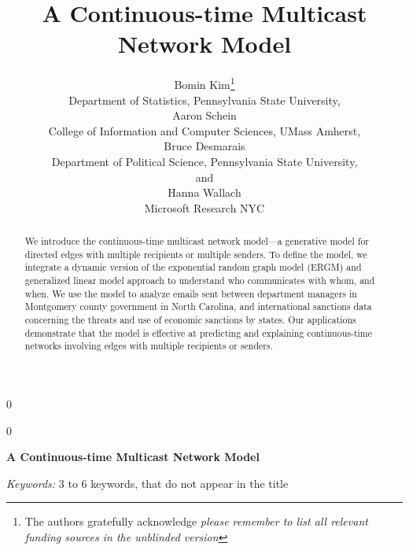 \documentclass[12pt]{article}
\newcommand{\blind}{0}
\begin{document}
\def\spacingset#1{\renewcommand{\baselinestretch}%
{#1}\small\normalsize} \spacingset{1}



\blind
{
  \title{\bf A Continuous-time Multicast \\Network Model}
  \author{Bomin Kim\thanks{
    The authors gratefully acknowledge \textit{please remember to list all relevant funding sources in the unblinded version}}\hspace{.2cm}\\
    Department of Statistics, Pennsylvania State University,\\
  Aaron Schein\\
  College of Information and Computer Sciences, UMass Amherst,\\
    Bruce Desmarais\\
    Department of Political Science, Pennsylvania State University,\\
    and\\
    Hanna Wallach\\
    Microsoft Research NYC}
  \maketitle
} \fi

\blind
{
  \bigskip
  \bigskip
  \bigskip
  \begin{center}
    {\LARGE\bf A Continuous-time Multicast Network Model}
\end{center}
  \medskip
} \fi

\bigskip
\begin{abstract}
We introduce the continuous-time multicast network model---a generative model for directed edges with multiple recipients or multiple senders. To define the model, we
integrate a dynamic version of the exponential random graph model (ERGM) and generalized linear model approach to understand who communicates with whom, and when. We use
the model to analyze emails sent between department managers in Montgomery county government in North Carolina, and international sanctions data concerning the threats and use of economic sanctions by states. Our applications demonstrate that the model is effective at predicting and explaining continuous-time networks involving edges with multiple recipients or senders.
	\end{abstract}

\noindent%
{\it Keywords:}  3 to 6 keywords, that do not appear in the title
\vfill
\end{document}
